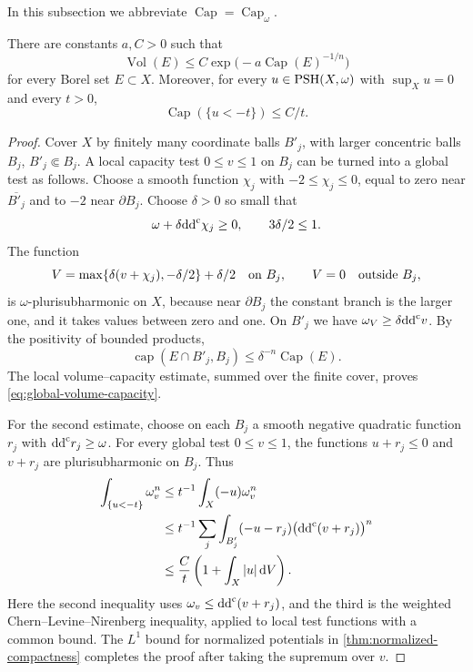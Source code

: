 In this subsection we abbreviate $\operatorname{Cap}=\operatorname{Cap}_\omega$.

\begin{lemma}\label{lem:global-capacity-estimates}
There are constants $a,C>0$ such that
\begin{equation}\label{eq:global-volume-capacity}
 \operatorname{Vol}(E)\leq C\exp\bigl(-a\operatorname{Cap}(E)^{-1/n}\bigr)
\end{equation}
for every Borel set $E\subset X$. Moreover, for every $u\in\mathrm{PSH}(X,\omega)$ with $\sup_Xu=0$ and every $t>0$,
\begin{equation}\label{eq:global-capacity-tail}
 \operatorname{Cap}(\{u<-t\})\leq C/t.
\end{equation}
\end{lemma}
\begin{proof}
Cover $X$ by finitely many coordinate balls $B'_j$, with larger concentric balls $B_j$, $B'_j\Subset B_j$. A local capacity test $0\leq v\leq1$ on $B_j$ can be turned into a global test as follows. Choose a smooth function $\chi_j$ with $-2\leq\chi_j\leq0$, equal to zero near $\overline{B'_j}$ and to $-2$ near $\partial B_j$. Choose $\delta>0$ so small that
\[
 \omega+\delta\mathrm{dd}^{\mathrm{c}}\chi_j\geq0,\qquad 3\delta/2\leq1.
\]
The function
\[
 V=\max\{\delta(v+\chi_j),-\delta/2\}+\delta/2
 \quad\hbox{on }B_j,
 \qquad V=0\quad\hbox{outside }B_j,
\]
is $\omega$-plurisubharmonic on $X$, because near $\partial B_j$ the constant branch is the larger one, and it takes values between zero and one. On $B'_j$ we have $\omega_V\geq\delta\mathrm{dd}^{\mathrm{c}} v$. By the positivity of bounded products,
\[
 \operatorname{cap}(E\cap B'_j,B_j)
 \leq\delta^{-n}\operatorname{Cap}(E).
\]
The local volume--capacity estimate, summed over the finite cover, proves \eqref{eq:global-volume-capacity}.

For the second estimate, choose on each $B_j$ a smooth negative quadratic function $r_j$ with $\mathrm{dd}^{\mathrm{c}} r_j\geq\omega$. For every global test $0\leq v\leq1$, the functions $u+r_j\leq0$ and $v+r_j$ are plurisubharmonic on $B_j$. Thus
\[
 \begin{split}
 \int_{\{u<-t\}}\omega_v^n
 &\leq t^{-1}\int_X(-u)\omega_v^n\\
 &\leq t^{-1}\sum_j\int_{B'_j}(-u-r_j)
                    \bigl(\mathrm{dd}^{\mathrm{c}}(v+r_j)\bigr)^n\\
 &\leq \frac Ct\left(1+\int_X|u|\,\mathrm{d}V\right).
 \end{split}
\]
Here the second inequality uses $\omega_v\leq\mathrm{dd}^{\mathrm{c}}(v+r_j)$, and the third is the weighted Chern--Levine--Nirenberg inequality, applied to local test functions with a common bound. The $L^1$ bound for normalized potentials in \cref{thm:normalized-compactness} completes the proof after taking the supremum over $v$.
\end{proof}

